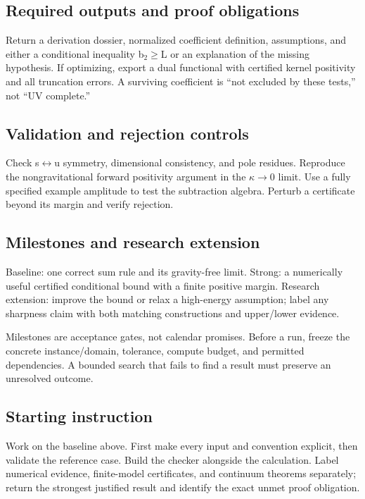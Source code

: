 \documentclass[
  11pt,
]{article}
\begin{document}
\subsection{Required outputs and proof obligations}

Return a derivation dossier, normalized coefficient definition,
assumptions, and either a conditional inequality
b\ensuremath{{}_{2}}\ensuremath{\ge}L or an explanation of the missing
hypothesis. If optimizing, export a dual functional with certified
kernel positivity and all truncation errors. A surviving coefficient is
``not excluded by these tests,'' not ``UV complete.''

\subsection{Validation and rejection controls}

Check s\ensuremath{\leftrightarrow}u symmetry, dimensional consistency,
and pole residues. Reproduce the nongravitational forward positivity
argument in the \ensuremath{\kappa}\ensuremath{\to}0 limit. Use a fully
specified example amplitude to test the subtraction algebra. Perturb a
certificate beyond its margin and verify rejection.

\subsection{Milestones and research extension}

Baseline: one correct sum rule and its gravity-free limit. Strong: a
numerically useful certified conditional bound with a finite positive
margin. Research extension: improve the bound or relax a high-energy
assumption; label any sharpness claim with both matching constructions
and upper/lower evidence.

Milestones are acceptance gates, not calendar promises. Before a run,
freeze the concrete instance/domain, tolerance, compute budget, and
permitted dependencies. A bounded search that fails to find a result
must preserve an unresolved outcome.

\subsection{Starting instruction}

Work on the baseline above. First make every input and convention
explicit, then validate the reference case. Build the checker alongside
the calculation. Label numerical evidence, finite-model certificates,
and continuum theorems separately; return the strongest justified result
and identify the exact unmet proof obligation.
\end{document}
